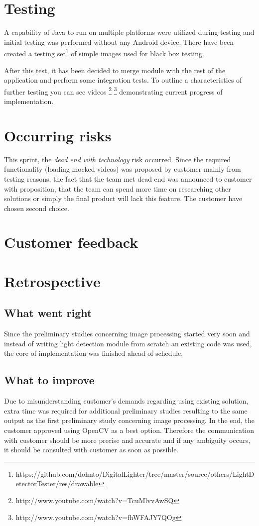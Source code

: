 \section{Testing}
A capability of Java to run on multiple platforms were utilized during testing and initial testing was performed without any Android device.
There have been created a testing set\footnote{https://github.com/dohnto/DigitalLighter/tree/master/source/others/LightDetectorTester/res/drawable} of simple images used for black box testing.

After this test, it has been decided to merge module with the rest of the application and perform some integration tests.
To outline a characteristics of further testing you can see videos \footnote{http://www.youtube.com/watch?v=TcuMlvvAwSQ} \footnote{http://www.youtube.com/watch?v=fhWFAJY7QOg} demonstrating current progress of implementation.

\section{Occurring risks}
This sprint, the \emph{dead end with technology} risk occurred. 
Since the required functionality (loading mocked videos) was proposed by customer mainly from testing reasons, the fact that the team met dead end was announced to customer with proposition, that the team can spend more time on researching other solutions or simply the final product will lack this feature.
The customer have chosen second choice.

\section{Customer feedback}

\section{Retrospective}
\subsection{What went right}
Since the preliminary studies concerning image processing started very soon and instead of writing light detection module from scratch an existing code was used, the core of implementation was finished ahead of schedule.

\subsection{What to improve}
Due to misunderstanding customer's demands regarding using existing solution, extra time was required for additional preliminary studies resulting to the same output as the first preliminary study concerning image processing. 
In the end, the customer approved using OpenCV as a best option.
Therefore the communication with customer should be more precise and accurate and if any ambiguity occurs, it should be consulted with customer as soon as possible.

